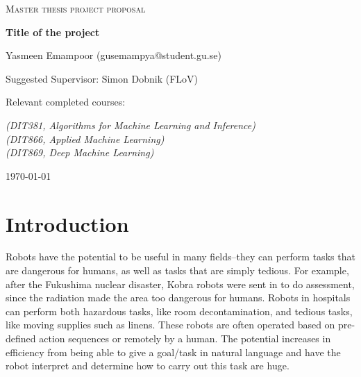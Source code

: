 \documentclass{article}
\begin{document}
\begin{titlepage}
  

\centering
  
  
{\scshape\LARGE Master thesis project proposal\\}
  
\vspace{0.5cm}
  
{\huge\bfseries Title of the project\\}
  
\vspace{2cm}
  
{\Large Yasmeen Emampoor (gusemampya@student.gu.se)\\}
  
\vspace{1.0cm}
  
{\large Suggested Supervisor: Simon Dobnik (FLoV)\\}
  
\vspace{1.5cm}
  
  
{\large Relevant completed courses:\par}
{\itshape (DIT381, Algorithms for Machine Learning and Inference)\\ (DIT866, Applied Machine Learning) \\ (DIT869, Deep Machine Learning)}
  
\vspace{1.5cm}
  
\vfill

\vfill
  
{\large \today\\} 


\end{titlepage}
\section{Introduction}
Robots have the potential to be useful in many fields--they can perform tasks that are dangerous for humans, as well as tasks that are simply tedious. For example, after the Fukushima nuclear disaster, Kobra robots were sent in to do assessment, since the radiation made the area too dangerous for humans\cite{kobra}. Robots in hospitals can perform both hazardous tasks, like room decontamination, and tedious tasks, like moving supplies such as linens. These robots are often operated based on pre-defined action sequences or remotely by a human. The potential increases in efficiency from being able to give a goal/task in natural language and have the robot interpret and determine how to carry out this task are huge. 
\end{document}
